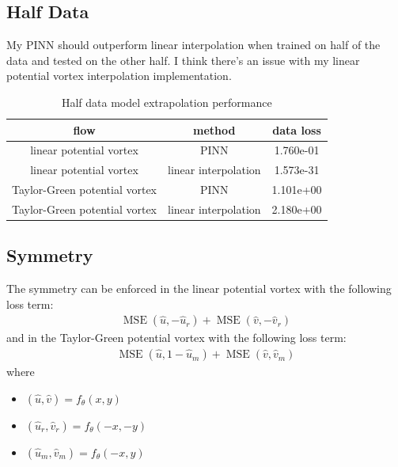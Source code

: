 \documentclass[11pt]{article}
\begin{document}
\subsection{Half Data} %

My PINN should outperform linear interpolation when trained on half of the data and tested on the other half. I think there's an issue with my linear potential vortex interpolation implementation.

\begin{table}[H]
    \centering
    \caption{Half data model extrapolation performance}
    \begin{tabular}{|c|c|c|}
        \hline
        flow & method & data loss \\
        \hline
        \hline
        linear potential vortex & PINN & 1.760e-01 \\
        linear potential vortex & linear interpolation & 1.573e-31 \\
        Taylor-Green potential vortex & PINN & 1.101e+00 \\
        Taylor-Green potential vortex & linear interpolation & 2.180e+00 \\
        \hline
    \end{tabular}
    \label{tab1c}
\end{table}

\subsection{Symmetry} %

The symmetry can be enforced in the linear potential vortex with the following loss term:
\begin{align*}
    \operatorname{MSE}\left(\hat{u}, -\hat{u}_r\right) + \operatorname{MSE}\left(\hat{v}, -\hat{v}_r\right)
\end{align*}
and in the Taylor-Green potential vortex with the following loss term:
\begin{align*}
    \operatorname{MSE}\left(\hat{u}, 1-\hat{u}_m\right) + \operatorname{MSE}\left(\hat{v}, \hat{v}_m\right)
\end{align*}
where
\begin{itemize}
    \item $\left(\hat{u}, \hat{v}\right) = f_\theta(x, y)$
    \item $\left(\hat{u}_r, \hat{v}_r\right) = f_\theta(-x, -y)$
    \item $\left(\hat{u}_m, \hat{v}_m\right) = f_\theta(-x, y)$
\end{itemize}
\end{document}
